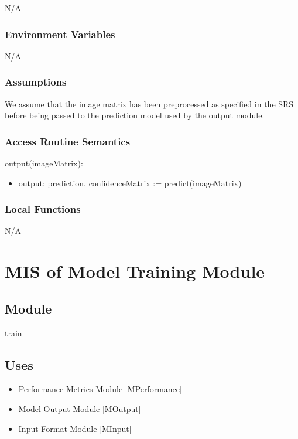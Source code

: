 \documentclass[12pt, titlepage]{article}
\begin{document}
N/A

\subsubsection{Environment Variables}

N/A

\subsubsection{Assumptions}

We assume that the image matrix has been preprocessed as specified in the SRS
before being passed to the prediction model used by the output module.
\subsubsection{Access Routine Semantics}

\noindent output(imageMatrix):
\begin{itemize}
\item output: prediction, confidenceMatrix := predict(imageMatrix)
\end{itemize}

\subsubsection{Local Functions}

N/A

\section{MIS of Model Training Module} \label{MTraining}

\subsection{Module}

train

\subsection{Uses}

\begin{itemize}
  \item Performance Metrics Module \ref{MPerformance}
  \item Model Output Module \ref{MOutput}
  \item Input Format Module \ref{MInput}
\end{itemize}
\end{document}
